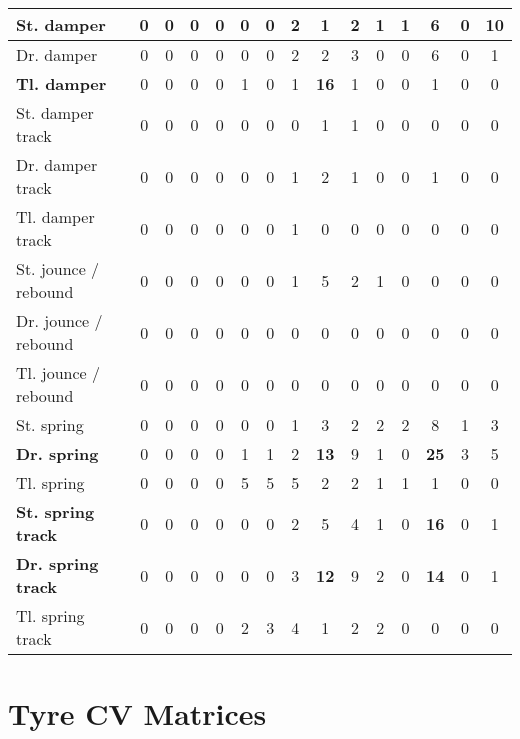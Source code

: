 \begin{table}[H]
\begin{tabular}{|l|c|c|c|c|c|c|c|c|c|c|c|c|c|c|}
    \hline
    \textbf{St. damper} & 0 & 0 & 0 & 0 & 0 & 0 & 2 & 1 & 2 & 1 & 1 & 6 & 0 & \textbf{10} \\
    \hline
    Dr. damper & 0 & 0 & 0 & 0 & 0 & 0 & 2 & 2 & 3 & 0 & 0 & 6 & 0 & 1 \\
    \hline
    \textbf{Tl. damper} & 0 & 0 & 0 & 0 & 1 & 0 & 1 & \textbf{16} & 1 & 0 & 0 & 1 & 0 & 0 \\
    \hline
    St. damper track & 0 & 0 & 0 & 0 & 0 & 0 & 0 & 1 & 1 & 0 & 0 & 0 & 0 & 0 \\
    \hline
    Dr. damper track & 0 & 0 & 0 & 0 & 0 & 0 & 1 & 2 & 1 & 0 & 0 & 1 & 0 & 0 \\
    \hline
    Tl. damper track & 0 & 0 & 0 & 0 & 0 & 0 & 1 & 0 & 0 & 0 & 0 & 0 & 0 & 0 \\
    \hline
    St. jounce / rebound & 0 & 0 & 0 & 0 & 0 & 0 & 1 & 5 & 2 & 1 & 0 & 0 & 0 & 0 \\
    \hline
    Dr. jounce / rebound & 0 & 0 & 0 & 0 & 0 & 0 & 0 & 0 & 0 & 0 & 0 & 0 & 0 & 0 \\
    \hline
    Tl. jounce / rebound & 0 & 0 & 0 & 0 & 0 & 0 & 0 & 0 & 0 & 0 & 0 & 0 & 0 & 0 \\
    \hline
    St. spring & 0 & 0 & 0 & 0 & 0 & 0 & 1 & 3 & 2 & 2 & 2 & 8 & 1 & 3 \\
    \hline
    \textcolor[rgb]{0.000, 0.620, 0.451}{\textbf{Dr. spring}} & 0 & 0 & 0 & 0 & 1 & 1 & 2 & \textbf{13} & 9 & 1 & 0 & \textcolor[rgb]{0.000, 0.620, 0.451}{\textbf{25}} & 3 & 5 \\
    \hline
    Tl. spring & 0 & 0 & 0 & 0 & 5 & 5 & 5 & 2 & 2 & 1 & 1 & 1 & 0 & 0 \\
    \hline
    \textbf{St. spring track} & 0 & 0 & 0 & 0 & 0 & 0 & 2 & 5 & 4 & 1 & 0 & \textbf{16} & 0 & 1 \\
    \hline
    \textbf{Dr. spring track} & 0 & 0 & 0 & 0 & 0 & 0 & 3 & \textbf{12} & 9 & 2 & 0 & \textbf{14} & 0 & 1 \\
    \hline
    Tl. spring track & 0 & 0 & 0 & 0 & 2 & 3 & 4 & 1 & 2 & 2 & 0 & 0 & 0 & 0 \\
    \hline

\end{tabular}%
\end{table}%


\section{Tyre CV Matrices}\label{section:cv-tyre}

